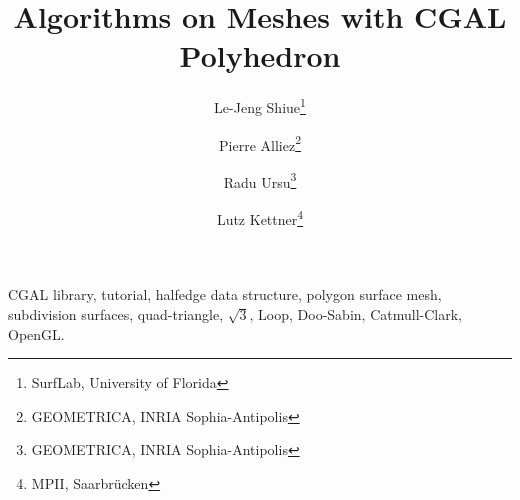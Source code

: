 \documentclass[letter,twoside,10pt]{article}
\begin{document}
\date{}
\title{{\LARGE {\sffamily\bfseries Algorithms on Meshes with CGAL Polyhedron}}}


\author{\small
\sffamily Le-Jeng Shiue\footnote{SurfLab, University of Florida}
\and \small
\sffamily Pierre Alliez\footnote{GEOMETRICA, INRIA Sophia-Antipolis}
\and \small
\sffamily Radu Ursu\footnote{GEOMETRICA, INRIA Sophia-Antipolis}
\and \small
\sffamily Lutz Kettner\footnote{MPII, Saarbr\"ucken}}
\maketitle

\thispagestyle{empty}

\abstract{
}

\vskip 3mm

                 CGAL library,
                 tutorial,
                 halfedge data structure, 
                 polygon surface mesh,
                 subdivision surfaces,
                 quad-triangle,
                 $\sqrt{3}$,
                 Loop,
                 Doo-Sabin,
                 Catmull-Clark,
                 OpenGL.
\end{document}
